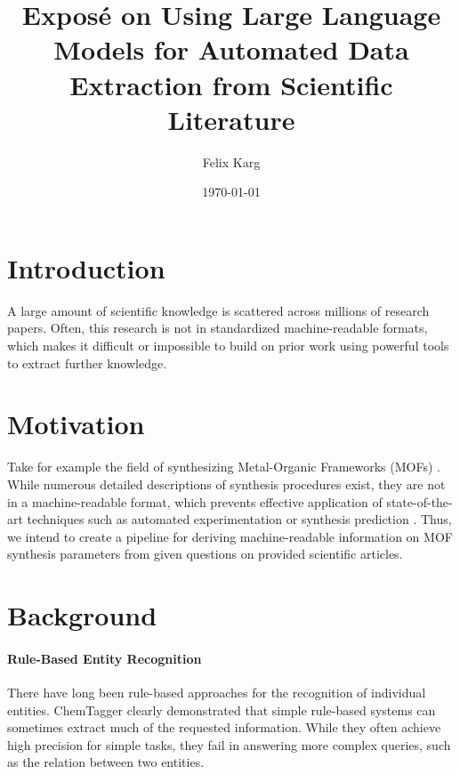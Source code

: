 \documentclass[a4paper,12pt]{article}
\title{Exposé on Using Large Language Models for Automated Data Extraction from Scientific Literature}
\author{Felix Karg}
\date{\today}
\newcommand{\margtodo}                                 %
{\marginpar{\textbf{\textcolor{red}{ToDo}}}{}}
\newcommand{\todo}[1]
{{\textbf{\textcolor{red}{[\margtodo{}#1]}}}{}}   %
\begin{document}
\maketitle




\section{Introduction}
A large amount of scientific knowledge is scattered across millions of research
papers. Often, this research is not in standardized machine-readable formats,
which makes it difficult or impossible to build on prior work using powerful
tools to extract further knowledge.  %

\section{Motivation}
Take for example the field of synthesizing Metal-Organic Frameworks (MOFs)
\cite{zhou_introduction_2012}. While numerous detailed descriptions of
synthesis procedures exist, they are not in a machine-readable format, which
prevents effective application of state-of-the-art techniques such as automated
experimentation \cite{shi_automated_2021} or synthesis prediction
\cite{luo_mof_2022}. Thus, we intend to create a pipeline for deriving
machine-readable information on MOF synthesis parameters from given questions
on provided scientific articles.


\section{Background}
\paragraph{Rule-Based Entity Recognition}
There have long been rule-based approaches for the recognition of individual
entities. ChemTagger \cite{hawizy_chemicaltagger_2011} clearly demonstrated
that simple rule-based systems can sometimes extract much of the requested
information. While they often achieve high precision for simple tasks,
they fail in answering more complex queries, such as the relation between
two entities.
\end{document}
